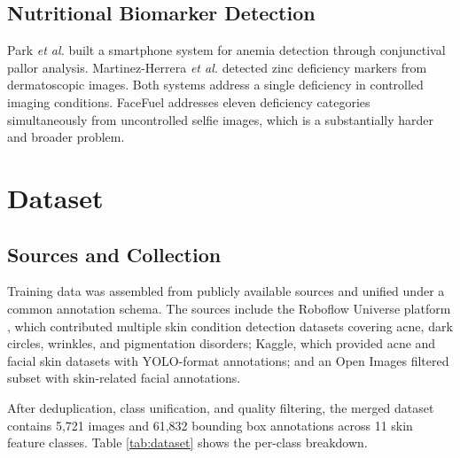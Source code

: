 \documentclass[journal]{IEEEtran}
\begin{document}
\subsection{Nutritional Biomarker Detection}

Park \textit{et al.} \cite{park2021} built a smartphone system for anemia
detection through conjunctival pallor analysis. Martinez-Herrera
\textit{et al.} \cite{martinez2020} detected zinc deficiency markers from
dermatoscopic images. Both systems address a single deficiency in controlled
imaging conditions. FaceFuel addresses eleven deficiency categories
simultaneously from uncontrolled selfie images, which is a substantially
harder and broader problem.

\section{Dataset}
\label{sec:dataset}

\subsection{Sources and Collection}

Training data was assembled from publicly available sources and unified under
a common annotation schema. The sources include the Roboflow Universe platform
\cite{roboflow2023}, which contributed multiple skin condition detection datasets
covering acne, dark circles, wrinkles, and pigmentation disorders; Kaggle, which
provided acne and facial skin datasets with YOLO-format annotations; and
an Open Images filtered subset with skin-related facial annotations.

After deduplication, class unification, and quality filtering, the merged
dataset contains 5{,}721 images and 61{,}832 bounding box annotations across
11 skin feature classes. Table \ref{tab:dataset} shows the per-class breakdown.
\end{document}
